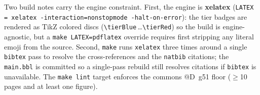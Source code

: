 Two build notes carry the engine constraint. First, the engine is
\textbf{xelatex} (\texttt{LATEX = xelatex {-}interaction=nonstopmode
{-}halt-on-error}): the tier badges are rendered as TikZ colored discs
(\verb|\tierBlue|\,\dots\verb|\tierRed|) so the build is engine-agnostic,
but a \texttt{make LATEX=pdflatex} override requires first stripping any
literal emoji from the source. Second, \texttt{make} runs
\texttt{xelatex} three times around a single \texttt{bibtex} pass to
resolve the cross-references and the \texttt{natbib} citations; the
\texttt{main.bbl} is committed so a single-pass rebuild still resolves
citations if \texttt{bibtex} is unavailable. The \texttt{make lint}
target enforces the commons @D~g51 floor ($\geq$10 pages and at least
one figure).
